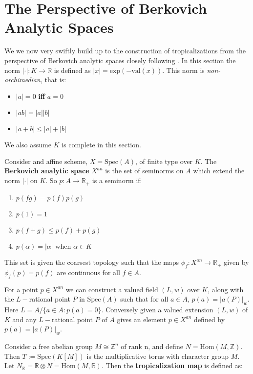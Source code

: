 \section{The Perspective of Berkovich Analytic Spaces}
We we now very swiftly build up to the construction of tropicalizations from the perspective of Berkovich analytic spaces closely following \cite{1108.6126}. 
    In this section the norm $|\cdot |:K \to \mathbb{R}$ is defined as $|x| = \text{exp}(-\text{val}(x))$. This norm is \textit{non-archimedian}, that is: 
    \begin{itemize}
        \item $|a| = 0$ \textbf{iff} $a=0$
        \item $|ab| = |a||b|$
        \item $|a+b| \leq |a|+|b|$
    \end{itemize}
    We also assume $K$ is complete in this section.
    \begin{definition}
        Consider and affine scheme, $X = \text{Spec}(A)$, of finite type over $K$. 
        The \textbf{Berkovich analytic space} $X^{an}$ is the set of seminorms on $A$ which extend the norm $|\cdot|$ on $K$. 
        So $p:A \to \mathbb{R}_{+}$ is a seminorm if:
        \begin{enumerate}
            \item $p(fg) = p(f)p(g)$
            \item $p(1)=1$
            \item $p(f+g)\leq p(f)+p(g)$
            \item $p(\alpha) = |\alpha|$ when $\alpha \in K$
        \end{enumerate}
        This set is given the coarsest topology such that the maps $\phi_f:X^{an}\to \mathbb{R}_{+}$ given by $\phi_f(p) = p(f)$ are continuous for all $f \in A$.
    \end{definition}
    For a point $p \in X^{an}$ we can construct a valued field $(L,w)$ over $K$, along with the $L-$rational point $P$ in $\text{Spec}(A)$ such that for all $a \in A$, $p(a) = |a(P)|_{w}$. 
    Here $L = A/\{a \in A: p(a)=0\}$. 
    Conversely given a valued extension $(L,w)$ of $K$ and any $L-$rational point $P$ of $A$ gives an element $p \in X^{an}$ defined by $p(a) = |a(P)|_{w}$.
    \par Consider a free abelian group $M \cong \mathbb{Z}^n$ of rank n, and define $N = \text{Hom}(M,\mathbb{Z})$. 
    Then $T:= \text{Spec}(K[M])$ is the multiplicative torus with character group $M$. 
    Let $N_{\mathbb{R}} = \mathbb{R} \otimes N = \text{Hom}(M,\mathbb{R})$. Then the \textbf{tropicalization map} is defined as:
